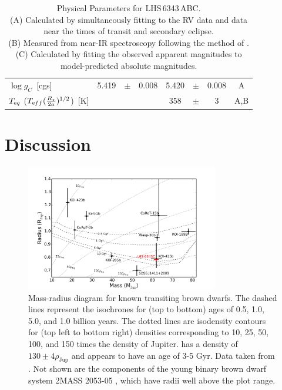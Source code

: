 \begin{landscape}
\begin{table}[hbt!]
\begin{center}
\begin{tabular}{lccccccc}
$\log g_C$~[cgs] &  5.419 & $\pm$ &       0.008 &      5.420 & $\pm$ &      0.008 & A \\
$T_{\textrm eq}$ ($T_{\textrm eff}(\frac{R_\star}{2a})^{1/2}$)~[K] & & & & 358 & $\pm$ & 3 & A,B \\
\hline
\end{tabular}
\caption[Physical Parameters for LHS\,6343\,ABC]{Physical Parameters for LHS\,6343\,ABC. \\
(A) Calculated by simultaneously fitting to the RV data and \itk{} data near the times of transit and secondary eclipse. \\
(B) Measured from near-IR spectroscopy following the method of \citet{RojasAyala12}. \\
(C) Calculated by fitting the observed apparent magnitudes to model-predicted absolute magnitudes.
}
\end{center}
\label{BigTable}
\end{table}
\end{landscape}
\clearpage




\section{Discussion}

\begin{figure}[htbp]
\centerline{\includegraphics[width=0.75\textwidth]{chapter4/f7.pdf}}
\caption[Mass-radius diagram for known transiting brown dwarfs]{Mass-radius diagram for known transiting brown dwarfs.
The dashed lines represent the \citet{Baraffe03} isochrones for (top to bottom) ages of 0.5, 1.0, 5.0, and 1.0 billion years.
The dotted lines are isodensity contours for (top left to bottom right) densities corresponding to 10, 25, 50, 100, and 150 times the density of Jupiter. 
\LC{} has a density of $130 \pm 4 \rho_\textrm{Jup}$ and appears to have an age of 3-5 Gyr.
Data taken from \citet{Deleuil08, Bouchy11a, Bouchy11b, Siverd12, Diaz13, Moutou13, Triaud13, Diaz14b, Littlefair14}.
Not shown are the components of the young binary brown dwarf system
2MASS 2053-05 \citep{Stassun06}, which have
radii well above the plot range.
  }
\label{MassRadiusPlot}
\end{figure}


